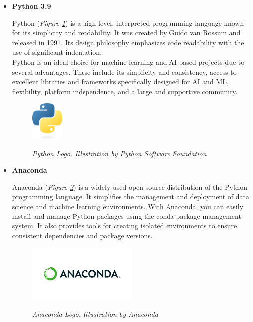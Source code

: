 \begin{itemize}
  \item \textbf{Python 3.9}

    Python (\textit{Figure \ref{fig:python-logo}}) is a high-level, interpreted
    programming language known for its simplicity and readability. It was
    created by Guido van Rossum and released in 1991. Its design philosophy
    emphasizes code readability with the use of significant indentation. \\

    Python is an ideal choice for machine learning and AI-based projects due to
    several advantages. These include its simplicity and consistency, access to
    excellent libraries and frameworks specifically designed for AI and ML,
    flexibility, platform independence, and a large and supportive community.

    \newpage

    \begin{figure}[H]
      \centering
      \includegraphics[width=0.15\textwidth]{imatges/studies_and_decisions/python-logo-only.png}
      \caption[Python Logo]{\textit{Python Logo. Illustration by Python Software Foundation}}
      {\label{fig:python-logo}}
    \end{figure}

  \item \textbf{Anaconda}

    Anaconda (\textit{Figure \ref{fig:anaconda-logo}}) is a widely used open-source distribution of the Python programming language. It simplifies the management and deployment of data science and machine learning environments. With Anaconda, you can easily install and manage Python packages using the conda package management system. It also provides tools for creating isolated environments to ensure consistent dependencies and package versions.

    \begin{figure}[H]
      \centering
      \begin{adjustbox}{trim=0cm 1cm 0cm 1cm, clip}
        \includegraphics[width=0.5\textwidth]{imatges/studies_and_decisions/anaconda-logo.png}
      \end{adjustbox}
      \caption[Anaconda Logo]{\textit{Anaconda Logo. Illustration by Anaconda}}
      {\label{fig:anaconda-logo}}
    \end{figure}


\end{itemize}
